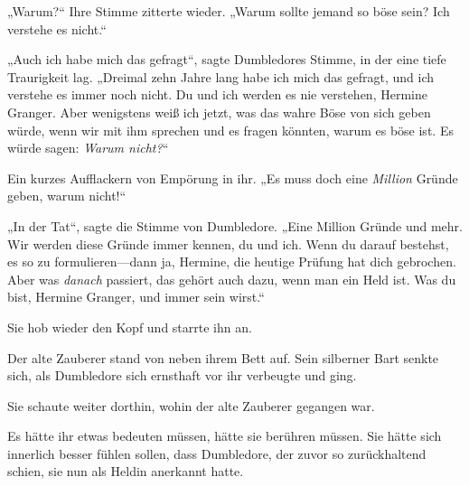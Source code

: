 „Warum?“ Ihre Stimme zitterte wieder. „Warum sollte jemand so böse sein? Ich verstehe es nicht.“

„Auch ich habe mich das gefragt“, sagte Dumbledores Stimme, in der eine tiefe Traurigkeit lag. „Dreimal zehn Jahre lang habe ich mich das gefragt, und ich verstehe es immer noch nicht. Du und ich werden es nie verstehen, Hermine Granger. Aber wenigstens weiß ich jetzt, was das wahre Böse von sich geben würde, wenn wir mit ihm sprechen und es fragen könnten, warum es böse ist. Es würde sagen: \emph{Warum nicht?}“

Ein kurzes Aufflackern von Empörung in ihr.
„Es muss doch eine \emph{Million} Gründe geben, warum nicht!“

„In der Tat“, sagte die Stimme von Dumbledore. „Eine Million Gründe und mehr. Wir werden diese Gründe immer kennen, du und ich. Wenn du darauf bestehst, es so zu formulieren—dann ja, Hermine, die heutige Prüfung hat dich gebrochen. Aber was \emph{danach} passiert, das gehört auch dazu, wenn man ein Held ist. Was du bist, Hermine Granger, und immer sein wirst.“

Sie hob wieder den Kopf und starrte ihn an.

Der alte Zauberer stand von neben ihrem Bett auf. Sein silberner Bart senkte sich, als Dumbledore sich ernsthaft vor ihr verbeugte und ging.

Sie schaute weiter dorthin, wohin der alte Zauberer gegangen war.

Es hätte ihr etwas bedeuten müssen, hätte sie berühren müssen. Sie hätte sich innerlich besser fühlen sollen, dass Dumbledore, der zuvor so zurückhaltend schien, sie nun als Heldin anerkannt hatte.

